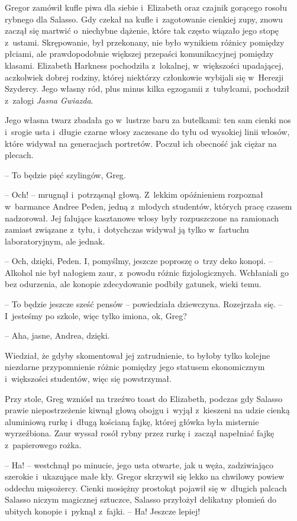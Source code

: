 \documentclass[oneside,polish,12pt,sfheadings]{mwbk}
\begin{document}
Gregor zamówił kufle piwa dla siebie i~Elizabeth oraz czajnik gorącego
rosołu rybnego dla Salasso. Gdy czekał na kufle i~zagotowanie cienkiej
zupy, znowu zaczął się martwić o~niechybne dążenie, które tak często
wiązało jego stopę z~ustami. Skrępowanie, był przekonany, nie było
wynikiem różnicy pomiędzy płciami, ale prawdopodobnie większej przepaści
komunikacyjnej pomiędzy klasami. Elizabeth Harkness pochodziła z~lokalnej, w~większości upadającej, aczkolwiek dobrej rodziny, której
niektórzy członkowie wybijali się w~Herezji Szydercy. Jego własny ród,
plus minus kilka egzogamii z~tubylcami, pochodził z~załogi \emph{Jasna
Gwiazda}.

Jego własna twarz zbadała go w~lustrze baru za butelkami: ten sam cienki
nos i~srogie usta i~długie czarne włosy zaczesane do tyłu od wysokiej
linii włosów, które widywał na generacjach portretów. Poczuł ich
obecność jak ciężar na plecach.

-- To będzie pięć szylingów, Greg.

-- Och! -- mrugnął i~potrząsnął głową. Z~lekkim opóźnieniem rozpoznał w~barmance Andree Peden, jedną z~młodych studentów, których pracę czasem
nadzorował. Jej falujące kasztanowe włosy były rozpuszczone na ramionach
zamiast związane z~tyłu, i~dotychczas widywał ją tylko w~fartuchu
laboratoryjnym, ale jednak. 

-- Och, dzięki, Peden. I, pomyślmy, jeszcze
poproszę o~trzy deko konopi. -- Alkohol nie był nałogiem zaur, z~powodu
różnic fizjologicznych. Wchłaniali go bez odurzenia, ale konopie
zdecydowanie podbiły gatunek, wieki temu.

-- To będzie jeszcze sześć pensów -- powiedziała dziewczyna. Rozejrzała
się. -- I~jesteśmy po szkole, więc tylko imiona, ok, Greg?

-- Aha, jasne, Andrea, dzięki.

Wiedział, że gdyby skomentował jej zatrudnienie, to byłoby tylko kolejne
niezdarne przypomnienie różnic pomiędzy jego statusem ekonomicznym i~większości studentów, więc się powstrzymał.

Przy stole, Greg wzniósł na trzeźwo toast do Elizabeth, podczas gdy
Salasso prawie niepostrzeżenie kiwnął głową obojgu i~wyjął z~kieszeni na
udzie cienką aluminiową rurkę i~długą kościaną fajkę, której główka była
misternie wyrzeźbiona. Zaur wyssał rosół rybny przez rurkę i~zaczął
napełniać fajkę z~papierowego rożka.

-- Ha! -- westchnął po minucie, jego usta otwarte, jak u węża,
zadziwiająco szerokie i~ukazujące małe kły. Gregor skrzywił się lekko na
chwilowy powiew oddechu mięsożercy. Cienki mosiężny prostokąt pojawił
się w~długich palcach Salasso niczym magicznej sztuczce, Salasso
przyłożył delikatny płomień do ubitych konopie i~pyknął z~fajki. -- Ha!
Jeszcze lepiej!
\end{document}
